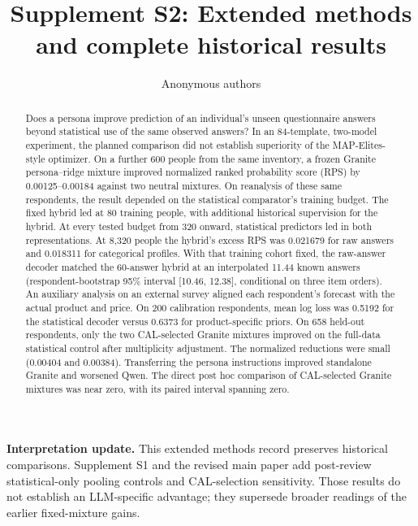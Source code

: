 \documentclass[10pt,twocolumn]{article}
\title{Supplement S2: Extended methods and complete historical results}
\author{Anonymous authors}
\date{}
\begin{document}
\maketitle
\noindent\textbf{Interpretation update.} This extended methods record preserves historical comparisons. Supplement S1 and the revised main paper add post-review statistical-only pooling controls and CAL-selection sensitivity. Those results do not establish an LLM-specific advantage; they supersede broader readings of the earlier fixed-mixture gains.\par

\begin{abstract}
Does a persona improve prediction of an individual's unseen questionnaire
answers beyond statistical use of the same observed answers? In an
84-template, two-model experiment, the planned comparison did not establish
superiority of the MAP-Elites-style optimizer. On a further 600 people from
the same inventory, a frozen Granite persona--ridge mixture improved
normalized ranked probability score (RPS) by 0.00125--0.00184 against two
neutral mixtures. On reanalysis of these same respondents, the result
depended on the statistical comparator's training budget. The fixed hybrid
led at 80 training people, with additional historical supervision for the
hybrid. At every tested budget from 320 onward, statistical predictors led
in both representations. At 8,320 people the hybrid's excess RPS was
0.021679 for raw answers and 0.018311 for categorical profiles. With that
training cohort fixed, the raw-answer decoder matched the 60-answer hybrid
at an interpolated 11.44 known answers (respondent-bootstrap 95\% interval
[10.46, 12.38], conditional on three item orders). An auxiliary analysis
on an external survey aligned each respondent's forecast with the actual
product and price. On 200 calibration respondents, mean log loss was 0.5192
for the statistical decoder versus 0.6373 for product-specific priors. On 658 held-out respondents, only the two CAL-selected Granite mixtures
improved on the full-data statistical control after multiplicity adjustment.
The normalized reductions were small (0.00404 and 0.00384). Transferring
the persona instructions improved standalone Granite and worsened Qwen.
The direct post hoc comparison of CAL-selected Granite mixtures was
near zero, with its paired interval spanning zero.
\end{abstract}
\end{document}
